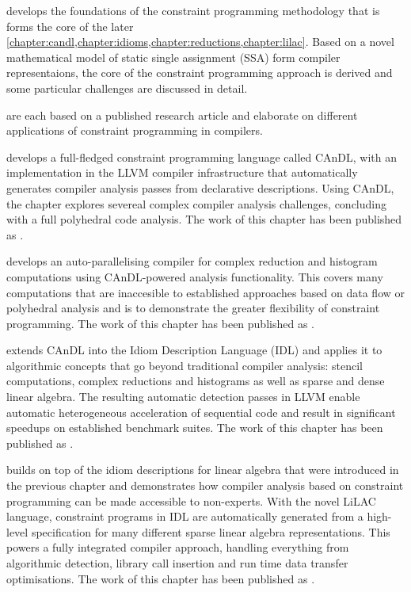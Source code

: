     {\bf{}} develops the foundations of the constraint
    programming methodology that is forms the core of the later
    \cref{chapter:candl,chapter:idioms,chapter:reductions,chapter:lilac}.
    Based on a novel mathematical model of static single assignment (SSA) form
    compiler representaions, the core of the constraint programming approach
    is derived and some particular challenges are discussed in detail.

    {\bf{}}
    are each based on a published research article and elaborate on different
    applications of constraint programming in compilers.

    {\bf{}} develops a full-fledged constraint programming
    language called CAnDL, with an implementation in the LLVM compiler
    infrastructure that automatically generates compiler analysis passes from
    declarative descriptions.
    Using CAnDL, the chapter explores severeal complex compiler analysis
    challenges, concluding with a full polyhedral code analysis.
    The work of this chapter has been published as
    {\bf\citet{Ginsbach:2018:CDS:3178372.3179515}}.

    {\bf{}} develops an auto-parallelising compiler for
    complex reduction and histogram computations using CAnDL-powered analysis
    functionality.
    This covers many computations that are inaccesible to established approaches
    based on data flow or polyhedral analysis and is to demonstrate the greater
    flexibility of constraint programming.
    The work of this chapter has been published as
    {\bf\citet{ginsbach2017discovery}}.

    {\bf{}} extends CAnDL into the Idiom Description Language
    (IDL) and applies it to algorithmic concepts that go beyond traditional
    compiler analysis: stencil computations, complex reductions and histograms
    as well as sparse and dense linear algebra.
    The resulting automatic detection passes in LLVM enable automatic
    heterogeneous acceleration of sequential code and result in significant
    speedups on established benchmark suites.
    The work of this chapter has been published as
    {\bf\citet{Ginsbach:2018:AML:3173162.3173182}}.

    {\bf{}} builds on top of the idiom descriptions for linear
    algebra that were introduced in the previous chapter and demonstrates how
    compiler analysis based on constraint programming can be made accessible to
    non-experts.
    With the novel LiLAC language, constraint programs in IDL are automatically
    generated from a high-level specification for many different sparse linear
    algebra representations.
    This powers a fully integrated compiler approach, handling everything from
    algorithmic detection, library call insertion and run time data transfer
    optimisations.
    The work of this chapter has been published as \citet{lilacpaper}.
